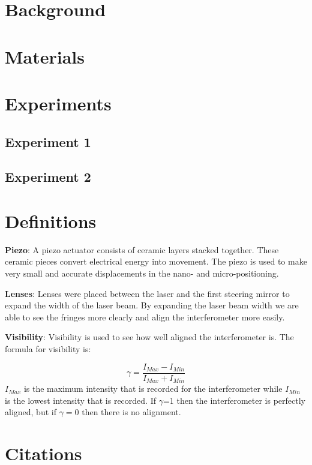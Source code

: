 \documentclass[twocolumn]{article}
\begin{document}
  


 
 \tableofcontents



\section{Background}  

\section{Materials}
		

		
\section{Experiments}
	\subsection{Experiment 1}
	\subsection{Experiment 2}
\appendix
\section{Definitions}

\textbf{Piezo}:
    A piezo actuator consists of ceramic layers stacked together. These ceramic pieces convert electrical energy into movement. The piezo is used to make very small and accurate displacements in the nano- and micro-positioning.

\textbf{Lenses}:
    Lenses were placed between the laser and the first steering mirror to expand the width of the laser beam. By expanding the laser beam width we are able to see the fringes more clearly and align the interferometer more easily.
    
%
\textbf{Visibility}:
    Visibility is used to see how well aligned the interferometer is. The formula for visibility is:

     \begin{equation}\label{eqn:Visibility}  
        \gamma= \frac{I_{Max} - I_{Min}}{I_{Max} + I_{Min}}
     \end{equation}    
%
$I_{Max}$ is the maximum intensity that is recorded for the interferometer while $I_{Min}$ is the lowest intensity that is recorded.  If $\gamma$=1 then the interferometer is perfectly aligned, but if $\gamma=0$ then there is no alignment. 

\section{Citations}

 
\end{document}
